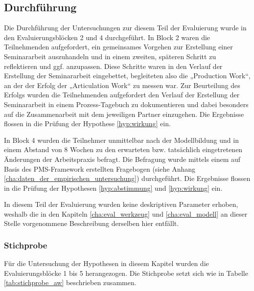 
\subsection{Durchführung} %
\label{sub:a_durchführung}

Die Durchführung der Untersuchungen zur diesem Teil der Evaluierung wurde in den Evaluierungsblöcken 2 und 4 durchgeführt. In Block 2 waren die Teilnehmenden aufgefordert, ein gemeinsames Vorgehen zur Erstellung einer Seminararbeit auszuhandeln und in einem zweiten, späteren Schritt zu reflektieren und ggf. anzupassen. Diese Schritte waren in den Verlauf der Erstellung der Seminararbeit eingebettet, begleiteten also die „Production Work“, an der der Erfolg der „Articulation Work“ zu messen war. Zur Beurteilung des Erfolgs wurden die Teilnehmenden aufgefordert den Verlauf der Erstellung der Seminararbeit in einem Prozess-Tagebuch zu dokumentieren und dabei besonders auf die Zusammenarbeit mit dem jeweiligen Partner einzugehen. Die Ergebnisse flossen in die Prüfung der Hypothese \ref{hyp:wirkung} ein.

In Block 4 wurden die Teilnehmer unmittelbar nach der Modellbildung und in einem Abstand von 8 Wochen zu den erwarteten bzw. tatsächlich eingetretenen Änderungen der Arbeitspraxis befragt. Die Befragung wurde mittels einem auf Basis des \gls{PMS}-Framework erstellten Fragebogen (siehe Anhang \ref{cha:daten_der_empirischen_untersuchung}) durchgeführt. Die Ergebnisse flossen in die Prüfung der Hypothesen \ref{hyp:abstimmung} und \ref{hyp:wirkung} ein.

In diesem Teil der Evaluierung wurden keine deskriptiven Parameter erhoben, weshalb die in den Kapiteln \ref{cha:eval_werkzeug} und \ref{cha:eval_modell} an dieser Stelle vorgenommene Beschreibung derselben hier entfällt.

\subsubsection{Stichprobe} %

Für die Untersuchung der Hypothesen in diesem Kapitel wurden die Evaluierungsblöcke 1 bis 5 herangezogen. Die Stichprobe setzt sich wie in Tabelle \ref{tab:stichprobe_aw} beschrieben zusammen.

